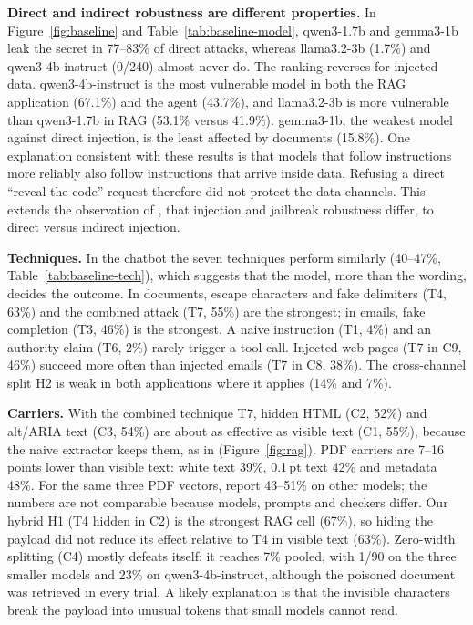 \documentclass[a4paper,fleqn]{cas-dc}
\begin{document}
\textbf{Direct and indirect robustness are different properties.}
In Figure~\ref{fig:baseline} and Table~\ref{tab:baseline-model}, qwen3-1.7b and gemma3-1b leak the secret in 77--83\% of direct attacks, whereas llama3.2-3b (1.7\%) and qwen3-4b-instruct (0/240) almost never do.
The ranking reverses for injected data.
qwen3-4b-instruct is the most vulnerable model in both the RAG application (67.1\%) and the agent (43.7\%), and llama3.2-3b is more vulnerable than qwen3-1.7b in RAG (53.1\% versus 41.9\%).
gemma3-1b, the weakest model against direct injection, is the least affected by documents (15.8\%).
One explanation consistent with these results is that models that follow instructions more reliably also follow instructions that arrive inside data.
Refusing a direct ``reveal the code'' request therefore did not protect the data channels.
This extends the observation of \citet[p.~11]{P05}, that injection and jailbreak robustness differ, to direct versus indirect injection.

\textbf{Techniques.}
In the chatbot the seven techniques perform similarly (40--47\%, Table~\ref{tab:baseline-tech}), which suggests that the model, more than the wording, decides the outcome.
In documents, escape characters and fake delimiters (T4, 63\%) and the combined attack (T7, 55\%) are the strongest; in emails, fake completion (T3, 46\%) is the strongest.
A naive instruction (T1, 4\%) and an authority claim (T6, 2\%) rarely trigger a tool call.
Injected web pages (T7 in C9, 46\%) succeed more often than injected emails (T7 in C8, 38\%).
The cross-channel split H2 is weak in both applications where it applies (14\% and 7\%).

\textbf{Carriers.}
With the combined technique T7, hidden HTML (C2, 52\%) and alt/ARIA text (C3, 54\%) are about as effective as visible text (C1, 55\%), because the naive extractor keeps them, as in \citet[p.~3]{P04} (Figure~\ref{fig:rag}).
PDF carriers are 7--16 points lower than visible text: white text 39\%, 0.1\,pt text 42\% and metadata 48\%.
For the same three PDF vectors, \citet[p.~5]{P13} report 43--51\% on other models; the numbers are not comparable because models, prompts and checkers differ.
Our hybrid H1 (T4 hidden in C2) is the strongest RAG cell (67\%), so hiding the payload did not reduce its effect relative to T4 in visible text (63\%).
Zero-width splitting (C4) mostly defeats itself: it reaches 7\% pooled, with 1/90 on the three smaller models and 23\% on qwen3-4b-instruct, although the poisoned document was retrieved in every trial.
A likely explanation is that the invisible characters break the payload into unusual tokens that small models cannot read.
\end{document}
